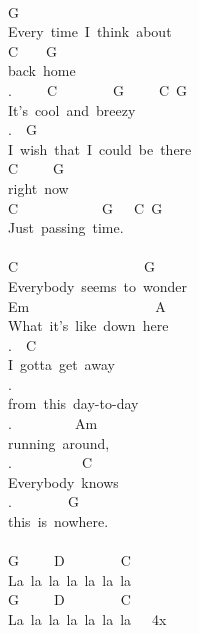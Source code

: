 {\\
G\ \\
Every\ time\ I\ think\ about\\
C\ \ \ \ G\\
back\ home\\
.\ \ \ \ \ C\ \ \ \ \ \ \ \ G\ \ \ \ \ C\ G\\
It's\ cool\ and\ breezy\\
.\ \ G\ \ \ \ \ \ \ \ \ \ \ \ \ \ \ \ \ \\
I\ wish\ that\ I\ could\ be\ there\\
C\ \ \ \ \ G\ \ \\
right\ now\\
C\ \ \ \ \ \ \ \ \ \ \ \ G\ \ \ C\ G\\
Just\ passing\ time.\\
\\
C\ \ \ \ \ \ \ \ \ \ \ \ \ \ \ \ \ \ G\\
Everybody\ seems\ to\ wonder\\
Em\ \ \ \ \ \ \ \ \ \ \ \ \ \ \ \ \ \ A\\
What\ it's\ like\ down\ here\\
.\ \ C\\
I\ gotta\ get\ away\\
.\ \ \ \ \ \ \ \ \ \ \ \ \\
from\ this\ day-to-day\\
.\ \ \ \ \ \ \ \ \ Am\\
running\ around,\\
.\ \ \ \ \ \ \ \ \ \ C\ \ \ \\
Everybody\ knows\\
.\ \ \ \ \ \ \ \ G\ \ \ \ \ \ \ \ \ \ \\
this\ is\ nowhere.\\
\\
G\ \ \ \ \ D\ \ \ \ \ \ \ \ C\\
La\ la\ la\ la\ la\ la\ la\\
G\ \ \ \ \ D\ \ \ \ \ \ \ \ C\\
La\ la\ la\ la\ la\ la\ la\ \ \ 4x\\}
